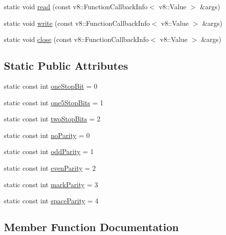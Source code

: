 \begin{DoxyCompactItemize}
\item 
static void \mbox{\hyperlink{class_rad_j_a_v_1_1_i_o_1_1_serial_comm_aa82ab1fc221dad51a32ea1bd81c4681f}{read}} (const v8\+::\+Function\+Callback\+Info$<$ v8\+::\+Value $>$ \&args)
\item 
static void \mbox{\hyperlink{class_rad_j_a_v_1_1_i_o_1_1_serial_comm_a8574061f0b7b4d96cecc9719566720ed}{write}} (const v8\+::\+Function\+Callback\+Info$<$ v8\+::\+Value $>$ \&args)
\item 
static void \mbox{\hyperlink{class_rad_j_a_v_1_1_i_o_1_1_serial_comm_a028ce76eef72c9061f89460d04d607bf}{close}} (const v8\+::\+Function\+Callback\+Info$<$ v8\+::\+Value $>$ \&args)
\end{DoxyCompactItemize}
\subsection*{Static Public Attributes}
\begin{DoxyCompactItemize}
\item 
static const int \mbox{\hyperlink{class_rad_j_a_v_1_1_i_o_1_1_serial_comm_a369f619b32872a85797b99ee823074dd}{one\+Stop\+Bit}} = 0
\item 
static const int \mbox{\hyperlink{class_rad_j_a_v_1_1_i_o_1_1_serial_comm_a1005ca22864e69ea4d4a2c5317f7cca3}{one5\+Stop\+Bits}} = 1
\item 
static const int \mbox{\hyperlink{class_rad_j_a_v_1_1_i_o_1_1_serial_comm_a86aa6521455110cd0b5c625962bf840f}{two\+Stop\+Bits}} = 2
\item 
static const int \mbox{\hyperlink{class_rad_j_a_v_1_1_i_o_1_1_serial_comm_a54a414628a3aeaf48bf5468104aa40f3}{no\+Parity}} = 0
\item 
static const int \mbox{\hyperlink{class_rad_j_a_v_1_1_i_o_1_1_serial_comm_a40e0966381fc7dc72bd87127f4e088f7}{odd\+Parity}} = 1
\item 
static const int \mbox{\hyperlink{class_rad_j_a_v_1_1_i_o_1_1_serial_comm_a245e04170ac540a60980b715fd47fe5d}{even\+Parity}} = 2
\item 
static const int \mbox{\hyperlink{class_rad_j_a_v_1_1_i_o_1_1_serial_comm_a8b2fdc87c6f79cb92a06be7d5d3c8f55}{mark\+Parity}} = 3
\item 
static const int \mbox{\hyperlink{class_rad_j_a_v_1_1_i_o_1_1_serial_comm_a03ddef581761bf328a1ad5c22ee625da}{space\+Parity}} = 4
\end{DoxyCompactItemize}


\subsection{Member Function Documentation}
\mbox{\label{class_rad_j_a_v_1_1_i_o_1_1_serial_comm_a028ce76eef72c9061f89460d04d607bf}} 
